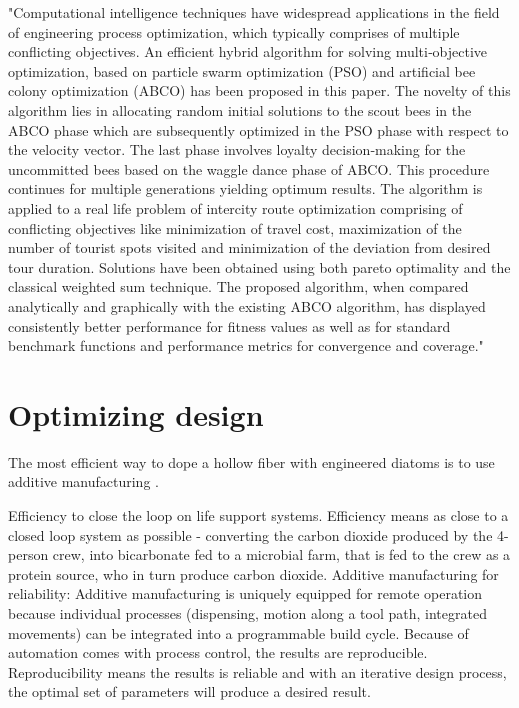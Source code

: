 \documentclass[a4paper,11pt]{article}
\begin{document}
"Computational intelligence techniques have widespread applications in the field of engineering process optimization, which typically comprises of multiple conflicting objectives. An efficient hybrid algorithm for solving multi‐objective optimization, based on particle swarm optimization (PSO) and artificial bee colony optimization (ABCO) has been proposed in this paper. The novelty of this algorithm lies in allocating random initial solutions to the scout bees in the ABCO phase which are subsequently optimized in the PSO phase with respect to the velocity vector. The last phase involves loyalty decision‐making for the uncommitted bees based on the waggle dance phase of ABCO. This procedure continues for multiple generations yielding optimum results. The algorithm is applied to a real life problem of intercity route optimization comprising of conflicting objectives like minimization of travel cost, maximization of the number of tourist spots visited and minimization of the deviation from desired tour duration. Solutions have been obtained using both pareto optimality and the classical weighted sum technique. The proposed algorithm, when compared analytically and graphically with the existing ABCO algorithm, has displayed consistently better performance for fitness values as well as for standard benchmark functions and performance metrics for convergence and coverage."\cite{beed2020hybrid}


\section{Optimizing design}

The most efficient way to dope a hollow fiber with engineered diatoms is to use additive manufacturing \cite{dalwadi2015understanding}.

Efficiency to close the loop on life support systems. Efficiency means as close to a closed loop system as possible - converting the carbon dioxide produced by the 4-person crew, into bicarbonate fed to a microbial farm, that is fed to the crew as a protein source, who in turn produce carbon dioxide. 
Additive manufacturing for reliability: Additive manufacturing is uniquely equipped for remote operation because individual processes (dispensing, motion along a tool path, integrated movements) can be integrated into a programmable build cycle. Because of automation comes with process control, the results are reproducible. Reproducibility means the results is reliable and with an iterative design process, the optimal set of parameters will produce a desired result.  
\end{document}
